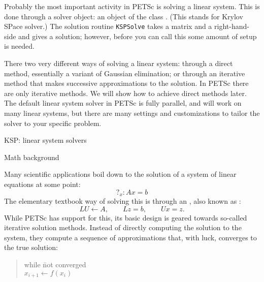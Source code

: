 
Probably the most important activity in PETSc is solving a linear
system. This is done through a solver object: an object of the class
. (This stands for Krylov SPace solver.) The solution routine
\lstinline{KSPSolve} takes a matrix and a right-hand-side and gives a
solution; however, before you can call this some amount of setup is needed.

There two very different ways of solving a
linear system: through a direct method, essentially a variant of
Gaussian elimination; or through an iterative method that makes
successive approximations to the solution. In PETSc there are only
iterative methods. We will show how to achieve direct methods later.
The default linear system solver in PETSc is fully parallel, and will
work on many linear systems, but there are many settings and
customizations to tailor the solver to your specific problem.

 {KSP: linear system solvers}
\label{sec:petsc-ksp}

 {Math background}
\label{sec:petsc-math}

Many scientific applications boil down to the solution of a system of
linear equations at some point:
\[ ?_x\colon Ax=b \]
The elementary textbook way of solving this is through an
,
also known as :
\[ LU\leftarrow A,\qquad Lz=b,\qquad Ux=z. \]
While PETSc has support for this, its basic design is geared towards
so-called iterative solution methods.
Instead of directly computing
the solution to the system, they compute a sequence of approximations
that, with luck, converges to the true solution:

\begin{quote}
  \begin{tabbing}
    while \=not converged\\
    \> $x_{i+1}\leftarrow f(x_i)$
  \end{tabbing}
\end{quote}

